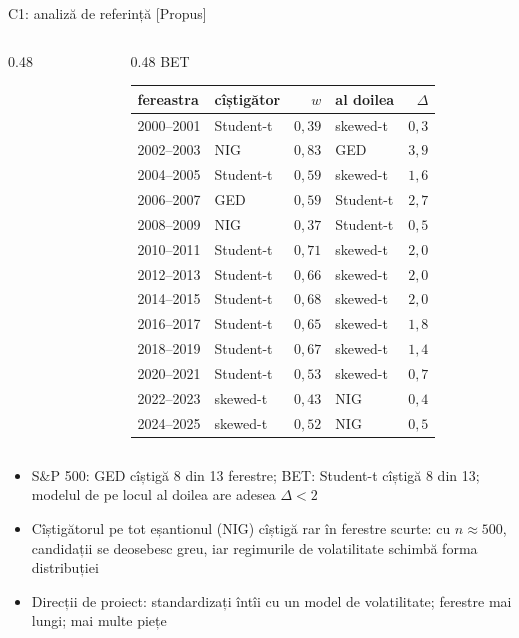\begin{frame}{C1: analiză de referință [Propus]}
\begin{columns}[T]
\begin{column}{0.48\textwidth}
\end{column}
\begin{column}{0.48\textwidth}
\centering BET\begin{center}
\tiny
\begin{tabular}{llrlr}
\toprule
fereastra & cîștigător & $w$ & al doilea & $\Delta$ \\
\midrule
2000--2001 & Student-t & $0{,}39$ & skewed-t & $0{,}3$ \\
2002--2003 & NIG & $0{,}83$ & GED & $3{,}9$ \\
2004--2005 & Student-t & $0{,}59$ & skewed-t & $1{,}6$ \\
2006--2007 & GED & $0{,}59$ & Student-t & $2{,}7$ \\
2008--2009 & NIG & $0{,}37$ & Student-t & $0{,}5$ \\
2010--2011 & Student-t & $0{,}71$ & skewed-t & $2{,}0$ \\
2012--2013 & Student-t & $0{,}66$ & skewed-t & $2{,}0$ \\
2014--2015 & Student-t & $0{,}68$ & skewed-t & $2{,}0$ \\
2016--2017 & Student-t & $0{,}65$ & skewed-t & $1{,}8$ \\
2018--2019 & Student-t & $0{,}67$ & skewed-t & $1{,}4$ \\
2020--2021 & Student-t & $0{,}53$ & skewed-t & $0{,}7$ \\
2022--2023 & skewed-t & $0{,}43$ & NIG & $0{,}4$ \\
2024--2025 & skewed-t & $0{,}52$ & NIG & $0{,}5$ \\
\bottomrule
\end{tabular}
\end{center}

\end{column}
\end{columns}\begin{itemize}
    \item S\&P 500: GED cîștigă 8 din 13 ferestre; BET: Student-t cîștigă 8 din 13; modelul de pe locul al doilea are adesea $\Delta < 2$
    \item Cîștigătorul pe tot eșantionul (NIG) cîștigă rar în ferestre scurte: cu $n \approx 500$, candidații se deosebesc greu, iar regimurile de volatilitate schimbă forma distribuției
    \item Direcții de proiect: standardizați întîi cu un model de volatilitate; ferestre mai lungi; mai multe piețe
\end{itemize}
\end{frame}
\fi

